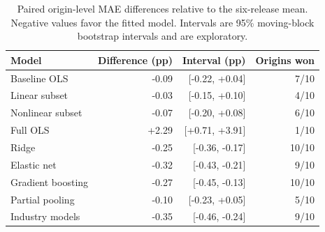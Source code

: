 \begin{table}[!htbp]
\centering
\small
\caption{Paired origin-level MAE differences relative to the six-release mean. Negative values favor the fitted model. Intervals are 95\% moving-block bootstrap intervals and are exploratory.}\label{tab:paired}
\begin{tabular}{lrrr}
\toprule
Model & Difference (pp) & Interval (pp) & Origins won \\
\midrule
Baseline OLS & -0.09 & [-0.22, +0.04] & 7/10 \\
Linear subset & -0.03 & [-0.15, +0.10] & 4/10 \\
Nonlinear subset & -0.07 & [-0.20, +0.08] & 6/10 \\
Full OLS & +2.29 & [+0.71, +3.91] & 1/10 \\
Ridge & -0.25 & [-0.36, -0.17] & 10/10 \\
Elastic net & -0.32 & [-0.43, -0.21] & 9/10 \\
Gradient boosting & -0.27 & [-0.45, -0.13] & 10/10 \\
Partial pooling & -0.10 & [-0.23, +0.05] & 5/10 \\
Industry models & -0.35 & [-0.46, -0.24] & 9/10 \\
\bottomrule
\end{tabular}
\end{table}
